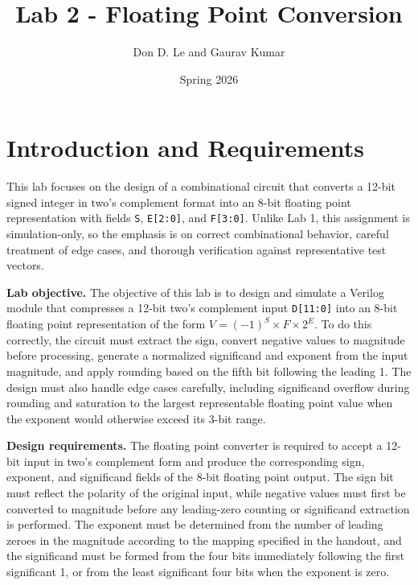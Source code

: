 \documentclass[10pt,letterpaper]{article}
\title{\textbf{Lab 2 - Floating Point Conversion}}
\author{Don D. Le and Gaurav Kumar}
\date{Spring 2026}
\begin{document}
\maketitle
\tableofcontents
\listoffigures
{}
\clearpage



\section{Introduction and Requirements}

This lab focuses on the design of a combinational circuit that converts a 12-bit signed integer in two's complement format into an 8-bit floating point representation with fields \texttt{S}, \texttt{E[2:0]}, and \texttt{F[3:0]}. Unlike Lab 1, this assignment is simulation-only, so the emphasis is on correct combinational behavior, careful treatment of edge cases, and thorough verification against representative test vectors.

\textbf{Lab objective.} The objective of this lab is to design and simulate a Verilog module that compresses a 12-bit two's complement input \texttt{D[11:0]} into an 8-bit floating point representation of the form $V = (-1)^S \times F \times 2^E$. To do this correctly, the circuit must extract the sign, convert negative values to magnitude before processing, generate a normalized significand and exponent from the input magnitude, and apply rounding based on the fifth bit following the leading 1. The design must also handle edge cases carefully, including significand overflow during rounding and saturation to the largest representable floating point value when the exponent would otherwise exceed its 3-bit range.

\textbf{Design requirements.} The floating point converter is required to accept a 12-bit input in two's complement form and produce the corresponding sign, exponent, and significand fields of the 8-bit floating point output. The sign bit must reflect the polarity of the original input, while negative values must first be converted to magnitude before any leading-zero counting or significand extraction is performed. The exponent must be determined from the number of leading zeroes in the magnitude according to the mapping specified in the handout, and the significand must be formed from the four bits immediately following the first significant 1, or from the least significant four bits when the exponent is zero. 
\end{document}
